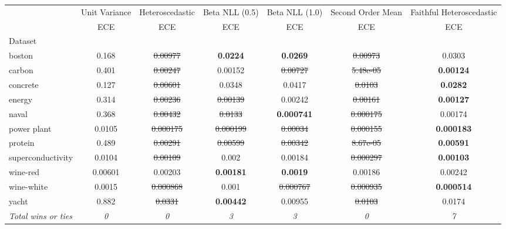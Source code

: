 \begin{tabular}{l|c|c|c|c|c|c}
\toprule
{} & {Unit Variance} & {Heteroscedastic} & {Beta NLL (0.5)} & {Beta NLL (1.0)} & {Second Order Mean} & {Faithful Heteroscedastic} \\
{} & {ECE} & {ECE} & {ECE} & {ECE} & {ECE} & {ECE} \\
{Dataset} & {} & {} & {} & {} & {} & {} \\
\midrule
boston & 0.168 & \sout{0.00977} & \textbf{0.0224} & \textbf{0.0269} & \sout{0.00973} & 0.0303 \\
carbon & 0.401 & \sout{0.00247} & 0.00152 & \sout{0.00727} & \sout{5.48e-05} & \textbf{0.00124} \\
concrete & 0.127 & \sout{0.00601} & 0.0348 & 0.0417 & \sout{0.0103} & \textbf{0.0282} \\
energy & 0.314 & \sout{0.00236} & \sout{0.00139} & 0.00242 & \sout{0.00161} & \textbf{0.00127} \\
naval & 0.368 & \sout{0.00432} & \sout{0.0133} & \textbf{0.000741} & \sout{0.000175} & 0.00174 \\
power plant & 0.0105 & \sout{0.000175} & \sout{0.000199} & \sout{0.00034} & \sout{0.000155} & \textbf{0.000183} \\
protein & 0.489 & \sout{0.00291} & \sout{0.00599} & \sout{0.00342} & \sout{8.67e-05} & \textbf{0.00591} \\
superconductivity & 0.0104 & \sout{0.00109} & 0.002 & 0.00184 & \sout{0.000297} & \textbf{0.00103} \\
wine-red & 0.00601 & 0.00203 & \textbf{0.00181} & \textbf{0.0019} & 0.00186 & 0.00242 \\
wine-white & 0.0015 & \sout{0.000868} & 0.001 & \sout{0.000767} & \sout{0.000935} & \textbf{0.000514} \\
yacht & 0.882 & \sout{0.0331} & \textbf{0.00442} & 0.00955 & \sout{0.0103} & 0.0174 \\
\textit{{Total wins or ties}} & \textit{0} & \textit{0} & \textit{3} & \textit{3} & \textit{0} & \textit{7} \\
\bottomrule
\end{tabular}
